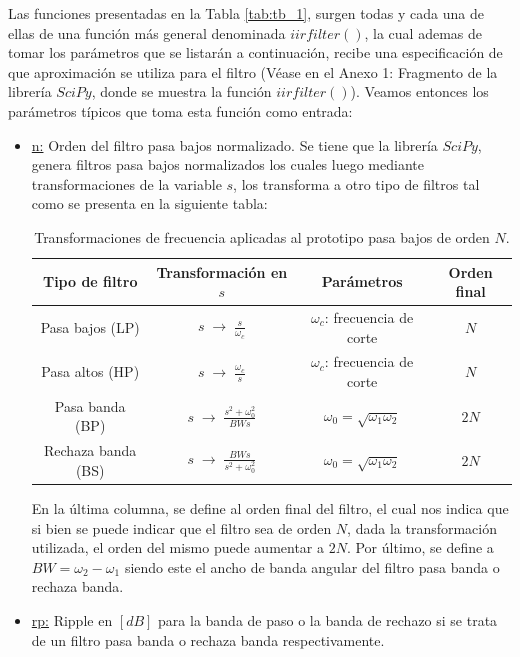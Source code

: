 \documentclass[12pt,a4paper]{article}
\begin{document}
Las funciones presentadas en la Tabla \ref{tab:tb_1}, surgen todas y cada una de ellas de una función más general denominada $iirfilter()$, la cual ademas de tomar los parámetros que se listarán a continuación, recibe una especificación de que aproximación se utiliza para el filtro (Véase en el Anexo 1: Fragmento de la librería $SciPy$, donde se muestra la función $iirfilter()$). Veamos entonces los parámetros típicos que toma esta función como entrada:

\begin{itemize}
    \item \underline{n:} Orden del filtro pasa bajos normalizado. Se tiene que la librería $SciPy$, genera filtros pasa bajos normalizados los cuales luego mediante transformaciones de la variable $s$, los transforma a otro tipo de filtros tal como se presenta en la siguiente tabla:
    \begin{table}[H]
        \centering
        \renewcommand{\arraystretch}{1.4}
        \begin{tabular}{|c|c|c|c|} \hline
        \textbf{Tipo de filtro} & \textbf{Transformación en $s$} & \textbf{Parámetros} & \textbf{Orden final} \\ \hline
            Pasa bajos (LP) & $s \;\rightarrow\; \frac{s}{\omega_c}$ & $\omega_c$: frecuencia de corte & $N$ \\ \hline
            Pasa altos (HP) & $s \;\rightarrow\; \frac{\omega_c}{s}$ & $\omega_c$: frecuencia de corte & $N$ \\ \hline
            Pasa banda (BP) & $s \;\rightarrow\; \frac{s^2 + \omega_0^2}{BWs}$ & $\omega_0 = \sqrt{\omega_1\omega_2}$ & $2N$ \\ \hline
            Rechaza banda (BS) & $s \;\rightarrow\; \frac{BW s}{s^{2} + \omega_{0}^{2}}$ & $\omega_{0} = \sqrt{\omega_{1}\omega_{2}}$ & $2N$ \\ \hline
        \end{tabular}
        \caption{Transformaciones de frecuencia aplicadas al prototipo pasa bajos de orden $N$.}
        \label{tab:tb_2}
    \end{table}
    En la última columna, se define al orden final del filtro, el cual nos indica que si bien se puede indicar que el filtro sea de orden $N$, dada la transformación utilizada, el orden del mismo puede aumentar a $2N$. Por último, se define a $BW = \omega_{2} - \omega_{1}$ siendo este el ancho de banda angular del filtro pasa banda o rechaza banda. 
    \item \underline{rp:} Ripple en $[dB]$ para la banda de paso o la banda de rechazo si se trata de un filtro pasa banda o rechaza banda respectivamente.

\end{itemize}
\end{document}
